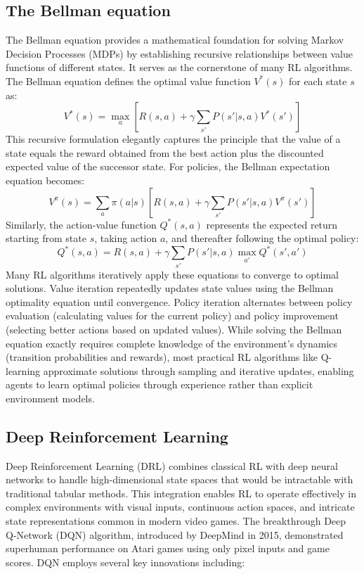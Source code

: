 \subsection{The Bellman equation}
The Bellman equation provides a mathematical foundation for solving Markov Decision Processes (MDPs) by establishing recursive relationships between value functions of different states. 
It serves as the cornerstone of many RL algorithms.
The Bellman equation defines the optimal value function $V^*(s)$ for each state $s$ as:
$$V^*(s) = \max_{a} \left[ R(s,a) + \gamma \sum_{s'} P(s'|s,a) V^*(s') \right]$$
This recursive formulation elegantly captures the principle that the value of a state equals the reward obtained from the best action plus the discounted expected value of the successor state. For policies, the Bellman expectation equation becomes:
$$V^{\pi}(s) = \sum_{a} \pi(a|s) \left[ R(s,a) + \gamma \sum_{s'} P(s'|s,a) V^{\pi}(s') \right]$$
Similarly, the action-value function $Q^*(s,a)$ represents the expected return starting from state $s$, taking action $a$, and thereafter following the optimal policy:
$$Q^*(s,a) = R(s,a) + \gamma \sum_{s'} P(s'|s,a) \max_{a'} Q^*(s',a')$$
Many RL algorithms iteratively apply these equations to converge to optimal solutions. Value iteration repeatedly updates state values using the Bellman optimality equation until convergence. Policy iteration alternates between policy evaluation (calculating values for the current policy) and policy improvement (selecting better actions based on updated values).
While solving the Bellman equation exactly requires complete knowledge of the environment's dynamics (transition probabilities and rewards), most practical RL algorithms like Q-learning approximate solutions through sampling and iterative updates, enabling agents to learn optimal policies through experience rather than explicit environment models.

\subsection{Deep Reinforcement Learning}

Deep Reinforcement Learning (DRL) combines classical RL with deep neural networks to handle high-dimensional state spaces that would be intractable with traditional tabular methods. 
This integration enables RL to operate effectively in complex environments with visual inputs, continuous action spaces, and intricate state representations common in modern video games.
The breakthrough Deep Q-Network (DQN) algorithm, introduced by DeepMind in 2015, demonstrated superhuman performance on Atari games using only pixel inputs and game scores. DQN employs several key innovations including:

